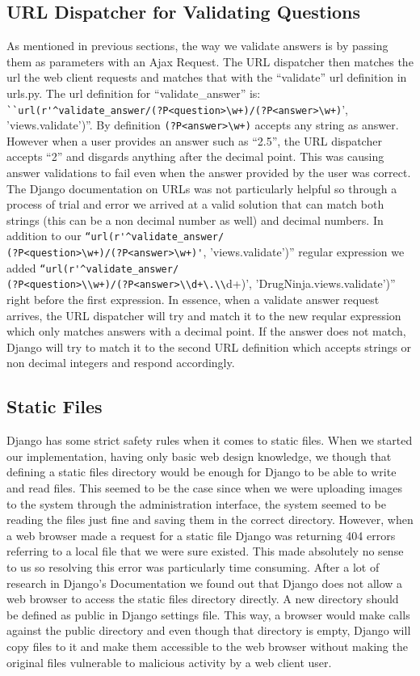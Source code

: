 \documentclass{l3proj}
\begin{document}
\subsection{URL Dispatcher for Validating Questions}
As mentioned in previous sections, the way we validate answers is by passing them as parameters with an Ajax Request.  The URL dispatcher then matches the url the web client requests and matches that with the ``validate'' url definition in urls.py. The url definition for ``validate\_answer'' is: \verb|``url(r'^validate_answer/(?P<question>\w+)/(?P<answer>\w+)|', 'views.validate')''. By definition \verb|(?P<answer>\w+)| accepts any string as answer. However when a user provides an answer such as “2.5”, the URL dispatcher accepts “2” and disgards anything after the decimal point. This was causing answer validations to fail even when the answer provided by the user was correct. The Django documentation on URLs was not particularly helpful so through a process of trial and error we arrived at a valid solution that can match both strings (this can be a non decimal number as well) and decimal numbers. In addition to our \verb|“url(r'^validate_answer/|\\\verb|(?P<question>\w+)/(?P<answer>\w+)'|, 'views.validate')” regular expression we added \verb|“url(r'^validate_answer/|\\\verb|(?P<question>\\w+)/(?P<answer>\\d+\.\\|d+)', 'DrugNinja.views.validate')” right before the first expression. In essence, when a validate answer request arrives, the URL dispatcher will try and match it to the new reqular expression which only matches answers with a decimal point. If the answer does not match, Django will try to match it to the second URL definition which accepts strings or non decimal integers and respond accordingly.

\subsection{Static Files}
Django has some strict safety rules when it comes to static files. When we started our implementation, having only basic web design knowledge, we though that defining a static files directory would be enough for Django to be able to write and read files. This seemed to be the case since when we were uploading images to the system through the administration interface, the system seemed to be reading the files just fine and saving them in the correct directory. However, when a web browser made a request for a static file Django was returning 404 errors referring to a local file that we were sure existed. This made absolutely no sense to us so resolving this error was particularly time consuming. After a lot of research in Django's Documentation we found out that Django does not allow a web browser to access the static files directory directly. A new directory should be defined as public in Django settings file. This way, a browser would make calls against the public directory and even though that directory is empty, Django will copy files to it and make them accessible to the web browser without making the original files vulnerable to malicious activity by a web client user.
\end{document}
